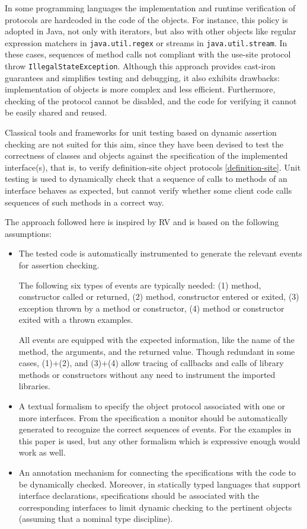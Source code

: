 In some programming languages the implementation and runtime verification of protocols are hardcoded in the code of the objects. For instance, this policy is adopted in Java, not only with iterators, but also with other objects like regular expression matchers in \lstinline|java.util.regex| or streams in \lstinline|java.util.stream|. In these cases, sequences of method calls not compliant with the use-site protocol throw \lstinline{IllegalStateException}.
Although this approach provides cast-iron guarantees and simplifies testing and debugging, it also exhibits drawbacks: implementation of objects is more  complex and less efficient. Furthermore, checking of the protocol cannot be disabled, and the code for verifying it cannot be easily shared and reused.

Classical tools and frameworks for unit testing based on dynamic assertion checking \cite{LangrHT15,FardM17} are not suited for this aim, since they have been devised to test the correctness of classes and objects against the specification of the implemented interface(s), that is, to verify definition-site object protocols \cref{definition-site}. Unit testing is used to dynamically check that a sequence of calls to methods of an interface behaves as expected, but cannot verify whether some client code calls sequences of such methods in a correct way.

The approach followed here is inspired by RV and is based on the following assumptions:
\begin{itemize}
 \item The tested code is automatically instrumented to generate the relevant events for assertion checking.

       The following six types of events are typically needed: (1) method, constructor called or returned, (2) method, constructor entered or exited, (3) exception thrown by a method or constructor, (4) method or constructor exited with a thrown examples.

       All events are equipped with the expected information, like the name of the method, the arguments, and the returned value. Though redundant in some cases, (1)+(2), and (3)+(4) allow tracing of callbacks and calls of library methods or constructors without any need to instrument the imported libraries.
 \item A textual formalism to specify the object protocol associated with one or more interfaces. From the specification a monitor should be automatically generated to recognize the correct sequences of events. For the examples in this paper \rml is used, but any other formalism which is expressive enough would work as well.
 \item An annotation mechanism for connecting the specifications with the code to be dynamically checked. Moreover, in statically typed languages that support interface declarations, specifications should be associated with the corresponding interfaces to limit dynamic checking to the pertinent objects (assuming that a nominal type discipline).
\end{itemize}



